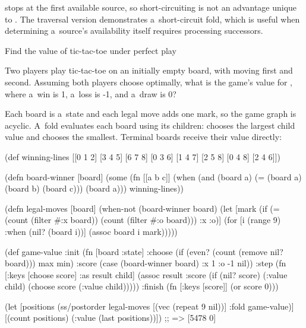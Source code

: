 {{{ stops at the first available source, so short-circuiting is
not an advantage unique to . The traversal version
demonstrates a~short-circuit fold, which is useful when determining a~source's
availability itself requires processing successors.

\secc Find the value of tic-tac-toe under perfect play

 Two players play tic-tac-toe on an initially empty board, with  moving first and
 second. Assuming both
players choose optimally, what is the game's value for , where
a~win is 1, a~loss is -1, and a~draw is 0?

\smallskip
{} Each board is a~state and each legal move adds one
mark, so the game graph is acyclic. A~fold evaluates each
board using its children:  chooses the largest child value and
 chooses the smallest. Terminal boards receive their value directly:

\begtt {}
(def winning-lines [[0 1 2] [3 4 5] [6 7 8]
                    [0 3 6] [1 4 7] [2 5 8]
                    [0 4 8] [2 4 6]])

(defn board-winner [board]
  (some (fn [[a b c]]
          (when (and (board a) (= (board a) (board b) (board c)))
            (board a)))
        winning-lines))

(defn legal-moves [board]
  (when-not (board-winner board)
    (let [mark (if (= (count (filter #{:x} board))
                      (count (filter #{:o} board)))
                 :x :o)]
      (for [i (range 9) :when (nil? (board i))]
        (assoc board i mark)))))

(def game-value
  {:init (fn [{board :state}]
           {:choose (if (even? (count (remove nil? board))) max min)
            :score (case (board-winner board) :x 1 :o -1 nil)})
   :step (fn [{:keys [choose score] :as result} child]
           (assoc result :score
                  (if (nil? score)
                    (:value child)
                    (choose score (:value child)))))
   :finish (fn [{:keys [score]}] (or score 0))})

(let [positions (ss/postorder legal-moves
                                    [(vec (repeat 9 nil))]
                                    {:fold game-value})]
  [(count positions) (:value (last positions))])
;; => [5478 0]
\endtt

}}}
